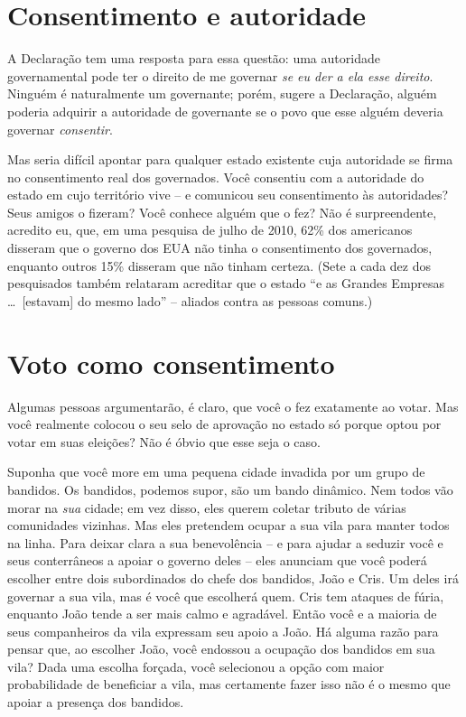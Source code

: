 \section{Consentimento e autoridade}

A Declaração tem uma resposta para essa questão: uma autoridade governamental pode ter o direito de me governar \emph{se eu der a ela esse direito}. Ninguém é naturalmente um governante; porém, sugere a Declaração, alguém poderia adquirir a autoridade de governante se o povo que esse alguém deveria governar \emph{consentir}.

Mas seria difícil apontar para qualquer estado existente cuja autoridade se firma no consentimento real dos governados. Você consentiu com a autoridade do estado em cujo território vive -- e comunicou seu consentimento às autoridades? Seus amigos o fizeram? Você conhece alguém que o fez? Não é surpreendente, acredito eu, que, em uma pesquisa de julho de 2010, 62\% dos americanos disseram que o governo dos EUA não tinha o consentimento dos governados, enquanto outros 15\% disseram que não tinham certeza. (Sete a cada dez dos pesquisados também relataram acreditar que o estado ``e as Grandes Empresas \ldots\ [estavam] do mesmo lado'' -- aliados contra as pessoas comuns.)

\section{Voto como consentimento}

Algumas pessoas argumentarão, é claro, que você o fez exatamente ao votar. Mas você realmente colocou o seu selo de aprovação no estado só porque optou por votar em suas eleições? Não é óbvio que esse seja o caso.

Suponha que você more em uma pequena cidade invadida por um grupo de bandidos. Os bandidos, podemos supor, são um bando dinâmico. Nem todos vão morar na \emph{sua} cidade; em vez disso, eles querem coletar tributo de várias comunidades vizinhas. Mas eles pretendem ocupar a sua vila para manter todos na linha. Para deixar clara a sua benevolência -- e para ajudar a seduzir você e seus conterrâneos a apoiar o governo deles -- eles anunciam que você poderá escolher entre dois subordinados do chefe dos bandidos, João e Cris. Um deles irá governar a sua vila, mas é você que escolherá quem. Cris tem ataques de fúria, enquanto João tende a ser mais calmo e agradável. Então você e a maioria de seus companheiros da vila expressam seu apoio a João. Há alguma razão para pensar que, ao escolher João, você endossou a ocupação dos bandidos em sua vila? Dada uma escolha forçada, você selecionou a opção com maior probabilidade de beneficiar a vila, mas certamente fazer isso não é o mesmo que apoiar a presença dos bandidos.


